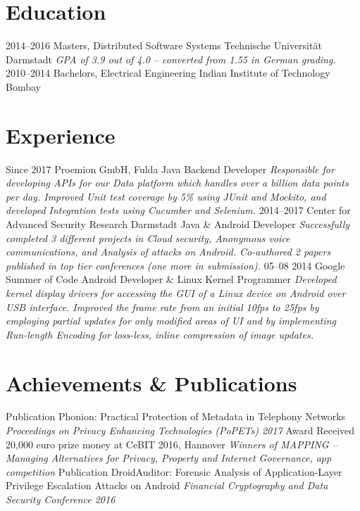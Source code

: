\documentclass[]{friggeri-cv}
\begin{document}
\section{Education}
    \begin{entrylist}
        \entry
            {2014–2016}
            {Masters, {\normalfont Distributed Software Systems}}
            {Technische Universität Darmstadt}
            {\emph{GPA of 3.9 out of 4.0 -- converted from 1.55 in German grading.}}
        \entry
            {2010–2014}
            {Bachelors, {\normalfont Electrical Engineering}}
            {Indian Institute of Technology Bombay}
            {}%
    \end{entrylist}

\section{Experience}
    \begin{entrylist}
        \entry
            {Since 2017}
            {Proemion GmbH, Fulda}
            {Java Backend Developer}
            {\emph{Responsible for developing APIs for our Data platform which handles over a billion data points per day. Improved Unit test coverage by 5\% using JUnit and Mockito, and developed Integration tests using Cucumber and Selenium.}}
        \entry
            {2014–2017}
            {Center for Advanced Security Research Darmstadt}
            {Java \& Android Developer}
            {\emph{Successfully completed 3 different projects in Cloud security, Anonymous voice communications, and Analysis of attacks on Android. Co-authored 2 papers published in top tier conferences (one more in submission).}}
        \entry
            {05–08 2014}
            {Google Summer of Code}
            {Android Developer \& Linux Kernel Programmer}
            {\emph{Developed kernel display drivers for accessing the GUI of a Linux device on Android over USB interface. Improved the frame rate from an initial 10fps to 25fps by employing partial updates for only modified areas of UI and by implementing Run-length Encoding for loss-less, inline compression of image updates.}}
    \end{entrylist}

\section{Achievements \& Publications}
	\begin{entrylist}
        \entry
            {Publication}
            {Phonion: Practical Protection of Metadata in Telephony Networks}{}
            {\emph{Proceedings on Privacy Enhancing Technologies (PoPETs) 2017}}
        \entry
            {Award}
            {Received 20,000 euro prize money at CeBIT 2016, Hannover}{}
            {\emph{Winners of MAPPING -- Managing Alternatives for Privacy, Property and Internet Governance, app competition}}
        \entry
            {Publication}
            {DroidAuditor: Forensic Analysis of Application-Layer Privilege Escalation Attacks on Android}{}
            {\emph{Financial Cryptography and Data Security Conference 2016}}        
	\end{entrylist}
\end{document}
